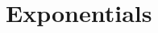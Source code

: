 \documentclass[article, a4paper, 11pt, oneside]{memoir}
\numberwithin{equation}{chapter}
\begin{document}



\chapter{Exponentials}

\newcommand{\eval}{\mathit{ev}}
\end{document}
